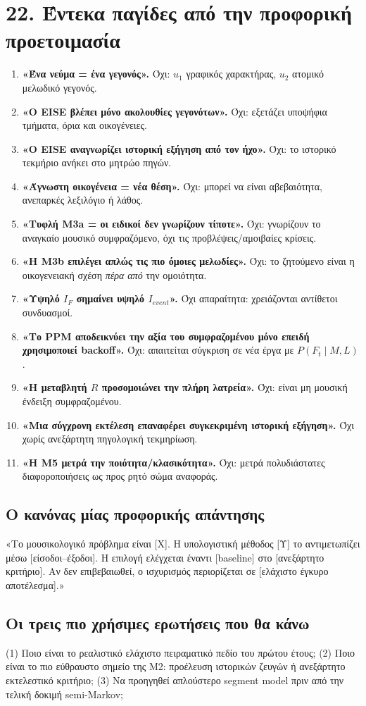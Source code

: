 \documentclass[9pt,a4paper]{extarticle}
\begin{document}
\newpage
\section*{22. Έντεκα παγίδες από την προφορική προετοιμασία}
\begin{enumerate}
\item \textbf{«Ένα νεύμα = ένα γεγονός».} Όχι: \(u_1\) γραφικός χαρακτήρας, \(u_2\) ατομικό μελωδικό γεγονός.
\item \textbf{«Ο EISE βλέπει μόνο ακολουθίες γεγονότων».} Όχι: εξετάζει υποψήφια τμήματα, όρια και οικογένειες.
\item \textbf{«Ο EISE αναγνωρίζει ιστορική εξήγηση από τον ήχο».} Όχι: το ιστορικό τεκμήριο ανήκει στο μητρώο πηγών.
\item \textbf{«Άγνωστη οικογένεια = νέα θέση».} Όχι: μπορεί να είναι αβεβαιότητα, ανεπαρκές λεξιλόγιο ή λάθος.
\item \textbf{«Τυφλή M3a = οι ειδικοί δεν γνωρίζουν τίποτε».} Όχι: γνωρίζουν το αναγκαίο μουσικό συμφραζόμενο, όχι τις προβλέψεις/αμοιβαίες κρίσεις.
\item \textbf{«Η M3b επιλέγει απλώς τις πιο όμοιες μελωδίες».} Όχι: το ζητούμενο είναι η οικογενειακή σχέση \emph{πέρα από} την ομοιότητα.
\item \textbf{«Υψηλό \(I_F\) σημαίνει υψηλό \(I_{event}\)».} Όχι απαραίτητα: χρειάζονται αντίθετοι συνδυασμοί.
\item \textbf{«Το PPM αποδεικνύει την αξία του συμφραζομένου μόνο επειδή χρησιμοποιεί backoff».} Όχι: απαιτείται σύγκριση σε νέα έργα με \(P(F_t\mid M,L)\).
\item \textbf{«Η μεταβλητή \(R\) προσομοιώνει την πλήρη λατρεία».} Όχι: είναι μη μουσική ένδειξη συμφραζομένου.
\item \textbf{«Μια σύγχρονη εκτέλεση επαναφέρει συγκεκριμένη ιστορική εξήγηση».} Όχι χωρίς ανεξάρτητη πηγολογική τεκμηρίωση.
\item \textbf{«Η M5 μετρά την ποιότητα/κλασικότητα».} Όχι: μετρά πολυδιάστατες διαφοροποιήσεις ως προς ρητό σώμα αναφοράς.
\end{enumerate}
\subsection*{Ο κανόνας μίας προφορικής απάντησης}
\begin{keybox}
«Το μουσικολογικό πρόβλημα είναι [Χ]. Η υπολογιστική μέθοδος [Υ] το αντιμετωπίζει μέσω [είσοδοι--έξοδοι]. Η επιλογή ελέγχεται έναντι [baseline] στο [ανεξάρτητο κριτήριο]. Αν δεν επιβεβαιωθεί, ο ισχυρισμός περιορίζεται σε [ελάχιστο έγκυρο αποτέλεσμα].»
\end{keybox}
\subsection*{Οι τρεις πιο χρήσιμες ερωτήσεις που θα κάνω}
(1) Ποιο είναι το ρεαλιστικό ελάχιστο πειραματικό πεδίο του πρώτου έτους; (2) Ποιο είναι το πιο εύθραυστο σημείο της M2: προέλευση ιστορικών ζευγών ή ανεξάρτητο εκτελεστικό κριτήριο; (3) Να προηγηθεί απλούστερο segment model πριν από την τελική δοκιμή semi-Markov;
\end{document}
